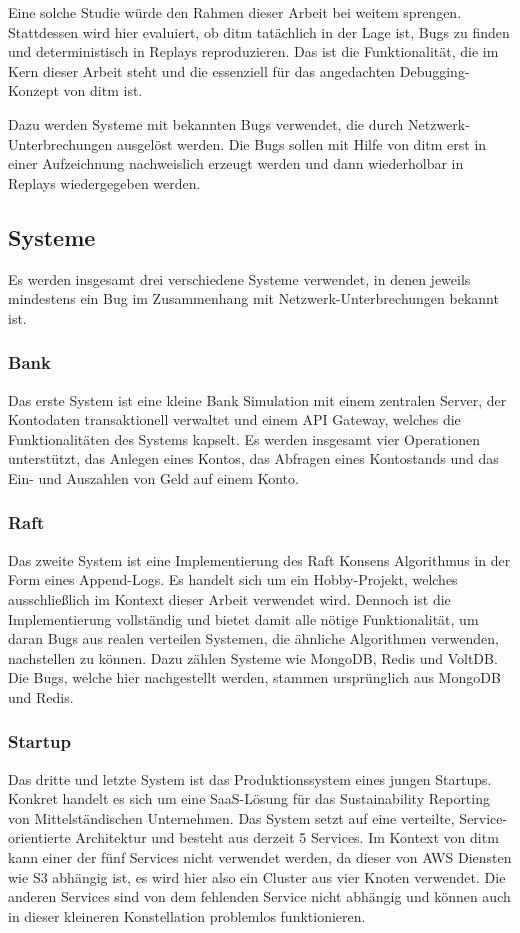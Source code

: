 \documentclass[12pt,a4paper]{report}
\begin{document}
Eine solche Studie würde den Rahmen dieser Arbeit bei weitem sprengen. Stattdessen wird hier evaluiert, ob ditm tatächlich in der
Lage ist, Bugs zu finden und deterministisch in Replays reproduzieren. Das ist die Funktionalität, die im Kern dieser Arbeit steht
und die essenziell für das angedachten Debugging-Konzept von ditm ist.

Dazu werden Systeme mit bekannten Bugs verwendet, die durch Netzwerk-Unterbrechungen ausgelöst werden. Die Bugs sollen mit Hilfe
von ditm erst in einer Aufzeichnung nachweislich erzeugt werden und dann wiederholbar in Replays wiedergegeben werden.

\subsection{Systeme}
Es werden insgesamt drei verschiedene Systeme verwendet, in denen jeweils mindestens ein Bug im Zusammenhang mit
Netzwerk-Unterbrechungen bekannt ist.

\subsubsection{Bank}
Das erste System ist eine kleine Bank Simulation mit einem zentralen Server, der Kontodaten transaktionell verwaltet und einem API
Gateway, welches die Funktionalitäten des Systems kapselt. Es werden insgesamt vier Operationen unterstützt, das Anlegen eines
Kontos, das Abfragen eines Kontostands und das Ein- und Auszahlen von Geld auf einem Konto.

\subsubsection{Raft}
Das zweite System ist eine Implementierung des Raft Konsens Algorithmus in der Form eines Append-Logs. Es handelt sich um ein
Hobby-Projekt, welches ausschließlich im Kontext dieser Arbeit verwendet wird. Dennoch ist die Implementierung vollständig und
bietet damit alle nötige Funktionalität, um daran Bugs aus realen verteilen Systemen, die ähnliche Algorithmen verwenden,
nachstellen zu können. Dazu zählen Systeme wie MongoDB, Redis und VoltDB. Die Bugs, welche hier nachgestellt werden, stammen
ursprünglich aus MongoDB und Redis.

\subsubsection{Startup}
Das dritte und letzte System ist das Produktionssystem eines jungen Startups. Konkret handelt es sich um eine SaaS-Lösung für das
Sustainability Reporting von Mittelständischen Unternehmen. Das System setzt auf eine verteilte, Service-orientierte Architektur
und besteht aus derzeit 5 Services. Im Kontext von ditm kann einer der fünf Services nicht verwendet werden, da dieser von AWS
Diensten wie S3 abhängig ist, es wird hier also ein Cluster aus vier Knoten verwendet. Die anderen Services sind von dem
fehlenden Service nicht abhängig und können auch in dieser kleineren Konstellation problemlos funktionieren.
\end{document}
